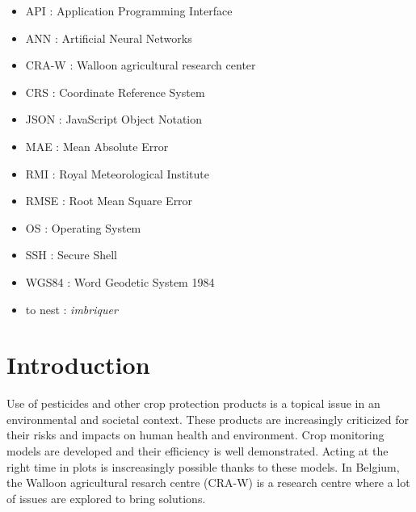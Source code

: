 \documentclass[12pt,twoside]{reedthesis}
\providecommand{\tightlist}{%
  \setlength{\itemsep}{0pt}\setlength{\parskip}{0pt}}
\theoremstyle{definition}
\theoremstyle{definition}
\theoremstyle{definition}
\theoremstyle{remark}
\begin{document}
  \begin{abbreviations}
    \begin{itemize}
    \item
      API : Application Programming Interface
    \item
      ANN : Artificial Neural Networks
    \item
      CRA-W : Walloon agricultural research center
    \item
      CRS : Coordinate Reference System
    \item
      JSON : JavaScript Object Notation
    \item
      MAE : Mean Absolute Error
    \item
      RMI : Royal Meteorological Institute
    \item
      RMSE : Root Mean Square Error
    \item
      OS : Operating System
    \item
      SSH : Secure Shell
    \item
      WGS84 : Word Geodetic System 1984
    \end{itemize}
  \end{abbreviations}
  \begin{definitions}
    \begin{itemize}
    \tightlist
    \item
      to nest : \emph{imbriquer}
    \end{itemize}
  \end{definitions}
  \printindex

  \listoffigures

  \listoftables

  \hypersetup{linkcolor=black}
  \setcounter{tocdepth}{2}
  \tableofcontents

\mainmatter %
\pagestyle{fancyplain} %

\chapter*{Introduction}\label{introduction}

Use of pesticides and other crop protection products is a topical issue
in an environmental and societal context. These products are
increasingly criticized for their risks and impacts on human health and
environment. Crop monitoring models are developed and their efficiency
is well demonstrated. Acting at the right time in plots is inscreasingly
possible thanks to these models. In Belgium, the Walloon agricultural
resarch centre (CRA-W) is a research centre where a lot of issues are
explored to bring solutions.
\end{document}
